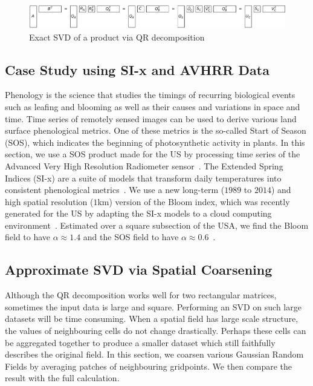 \documentclass[ijgi,article,submit,moreauthors,pdftex,10pt,a4paper]{Definitions/mdpi}
\begin{document}
\begin{figure}[H]
\centering
\includegraphics[width=120mm]{Results/qrProductSVD.pdf}
\caption[Exact SVD via QR decomposition]{Exact SVD of a product via QR decomposition}
\label{fig:qrProductSVD}
\end{figure}

\subsection{Case Study using SI-x and AVHRR Data}
\label{sec:Materials and Methods/Case Study using SI-x and AVHRR Data}

Phenology is the science that studies the timings of recurring biological events such as leafing and blooming as well as their causes and variations in space and time. Time series of remotely sensed images can be used to derive various land surface phenological metrics. One of these metrics is the so-called Start of Season (SOS), which indicates the beginning of photosynthetic activity in plants. In this section, we use a SOS product made for the US by processing time series of the Advanced Very High Resolution Radiometer sensor~\cite{Reed1994}. The Extended Spring Indices (SI-x) are a suite of models that transform daily temperatures into consistent phenological metrics~\cite{Schwartz2013}. We use a new long-term ($1989$ to $2014$) and high spatial resolution ($1$km) version of the Bloom index, which was recently generated for the US by adapting the SI-x models to a cloud computing environment~\cite{Izquierdo2015}. Estimated over a square subsection of the USA, we find the Bloom field to have $\alpha \approx 1.4$ and the SOS field to have $\alpha \approx 0.6$~\cite{Bogaardt2018}.

\subsection{Approximate SVD via Spatial Coarsening}
\label{sec:Materials and Methods/Approximate SVD via Spatial Coarsening}

Although the QR decomposition works well for two rectangular matrices, sometimes the input data is large and square. Performing an SVD on such large datasets will be time consuming. When a spatial field has large scale structure, the values of neighbouring cells do not change drastically. Perhaps these cells can be aggregated together to produce a smaller dataset which still faithfully describes the original field. In this section, we coarsen various Gaussian Random Fields by averaging patches of neighbouring gridpoints. We then compare the result with the full calculation.
\end{document}
